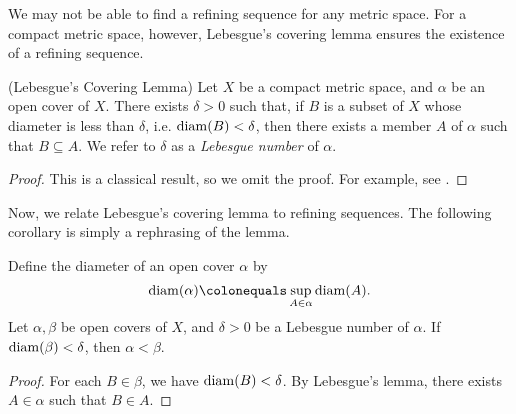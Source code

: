 \documentclass[10pt,twoside,draft]{book}
\begin{document}
We may not be able to find a refining sequence for any metric space.
For a compact metric space, however, Lebesgue's covering lemma ensures the existence of a refining sequence.
\begin{proposition}
  (Lebesgue's Covering Lemma)
  Let $X$ be a compact metric space, and $\alpha$ be an open cover of $X$.
  There exists $\delta > 0$ such that, if $B$ is a subset of $X$ whose diameter is less than $\delta$, i.e. $\mathrm{diam}(B) < \delta$, then there exists a member $A$ of $\alpha$ such that $B \subseteq A$.
  We refer to $\delta$ as a \textit{Lebesgue number} of $\alpha$.
  \label{lem:covering}
  \begin{proof}
    This is a classical result, so we omit the proof.
    For example, see \citet{royden}.
  \end{proof}
\end{proposition}
Now, we relate Lebesgue's covering lemma to refining sequences.
The following corollary is simply a rephrasing of the lemma.
\begin{corollary}
  Define the diameter of an open cover $\alpha$ by
  \begin{equation*}
    \diam(\alpha) \ceq \sup\limits_{A \in \alpha} \diam(A).
  \end{equation*}
  Let $\alpha, \beta$ be open covers of $X$, and $\delta > 0$ be a Lebesgue number of $\alpha$.
  If $\mathrm{diam}(\beta) < \delta$, then $\alpha < \beta$.
  \begin{proof}
    For each $B \in \beta$, we have $\mathrm{diam}(B) < \delta$.
    By Lebesgue's lemma, there exists $A \in \alpha$ such that $B \in A$.
  \end{proof}
\end{corollary}
\end{document}
